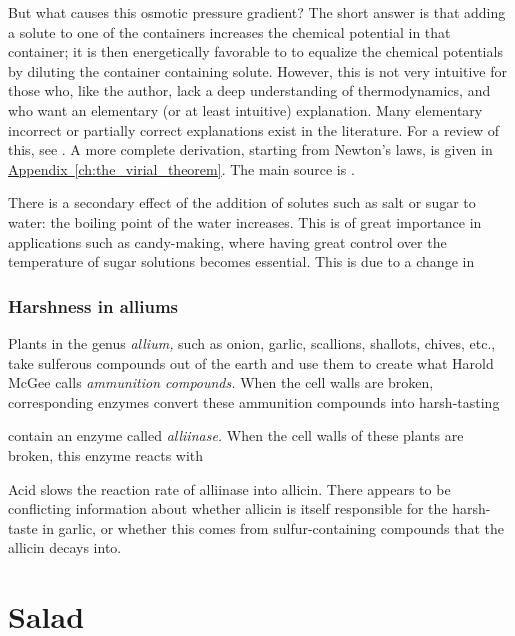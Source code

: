 \documentclass[a4paper,12pt]{scrreprt}
\theoremstyle{definition}
\theoremstyle{plain}
\theoremstyle{remark}
\begin{document}
But what causes this osmotic pressure gradient? The short answer is that adding a solute to one of the containers increases the chemical potential in that container; it is then energetically favorable to to equalize the chemical potentials by diluting the container containing solute. However, this is not very intuitive for those who, like the author, lack a deep understanding of thermodynamics, and who want an elementary (or at least intuitive) explanation. Many elementary incorrect or partially correct explanations exist in the literature. For a review of this, see \cite{whatisosmosis}. A more complete derivation, starting from Newton's laws, is given in \hyperref[ch:the_virial_theorem]{Appendix~\ref*{ch:the_virial_theorem}}. The main source is \cite{physicsofosmoticpressure}.

There is a secondary effect of the addition of solutes such as salt or sugar to water: the boiling point of the water increases. This is of great importance in applications such as candy-making, where having great control over the temperature of sugar solutions becomes essential. This is due to a change in

\subsection{Harshness in alliums}
\label{ssc:harshness_in_alliums}

Plants in the genus \emph{allium,} such as onion, garlic, scallions, shallots, chives, etc., take sulferous compounds out of the earth and use them to create what Harold McGee calls \emph{ammunition compounds.} When the cell walls are broken, corresponding enzymes convert these ammunition compounds into harsh-tasting

contain an enzyme called \emph{alliinase.} When the cell walls of these plants are broken, this enzyme reacts with

Acid slows the reaction rate of alliinase into allicin. There appears to be conflicting information about whether allicin is itself responsible for the harsh-taste in garlic, or whether this comes from sulfur-containing compounds that the allicin decays into.


\chapter{Salad}
\end{document}
